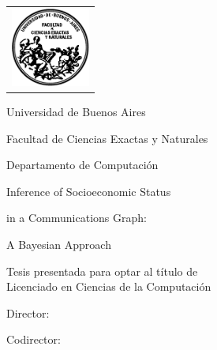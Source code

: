 \makeatletter

\newcommand{\HRule}{\rule{\linewidth}{0.2mm}}
%
\thispagestyle{empty}

\begin{center}\leavevmode

\vspace{-2cm}

\begin{tabular}{l}
\includegraphics[width=2.6cm]{template_tesis/logofcen.pdf}
\end{tabular}

{\large \sc Universidad de Buenos Aires}

{\large \sc Facultad de Ciencias Exactas y Naturales}

{\large \sc Departamento de Computaci\'on}

\vspace{4.0cm}

\begin{mdseries}
{\huge Inference of Socioeconomic Status}

{\huge in a Communications Graph:}

{\huge A Bayesian Approach}
\end{mdseries}

\vspace{2cm}

{\large Tesis presentada para optar al título de \\ Licenciado en Ciencias de la Computación}

\vspace{2cm}

{\Large \@author}

\end{center}

\vfill

{\large {Director: \director}}

\vspace{.2cm}

{\large {Codirector: \codirector}}

\vspace{.2cm}

{\large {\@date}}

\makeatother
